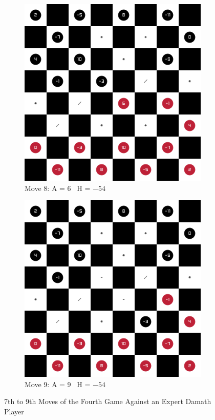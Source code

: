 \begin{figure}[H]
\begin{subfigure}{0.3\textwidth}
        \includegraphics[width=\textwidth]{images/games/game4/move_8.png}
        \caption*{Move 8: A = 6 \textbar\ H = $-54$}
    \end{subfigure}
    \quad
    \begin{subfigure}{0.3\textwidth}
        \centering
        \includegraphics[width=\textwidth]{images/games/game4/move_9.png}
        \caption*{Move 9: A = 9 \textbar\ H = $-54$}
    \end{subfigure} 
    \caption{7th to 9th Moves of the Fourth Game Against an Expert Damath Player}
    \label{fig:7-9-game4}
\end{figure}

